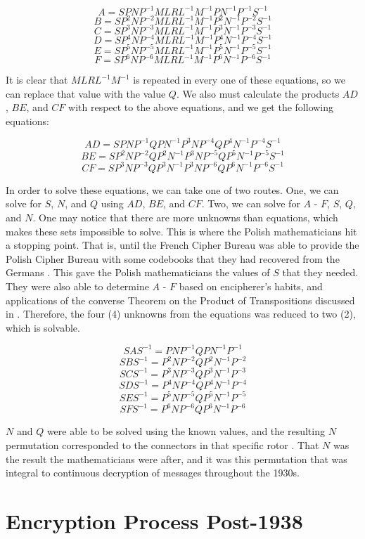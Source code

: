 $$A = SPNP^{-1}MLRL^{-1}M^{-1}PN^{-1}P^{-1}S^{-1}$$
$$B = SP^2NP^{-2}MLRL^{-1}M^{-1}P^2N^{-1}P^{-2}S^{-1}$$
$$C = SP^3NP^{-3}MLRL^{-1}M^{-1}P^3N^{-1}P^{-3}S^{-1}$$
$$D = SP^4NP^{-4}MLRL^{-1}M^{-1}P^4N^{-1}P^{-4}S^{-1}$$
$$E = SP^5NP^{-5}MLRL^{-1}M^{-1}P^5N^{-1}P^{-5}S^{-1}$$
$$F = SP^6NP^{-6}MLRL^{-1}M^{-1}P^6N^{-1}P^{-6}S^{-1}$$

It is clear that $MLRL^{-1}M^{-1}$ is repeated in every one of these equations, so we can replace that value with the value $Q$. \cite{wk85} We also must calculate the products $AD$, $BE$, and $CF$ with respect to the above equations, and we get the following equations:

$$AD = SPNP^{-1}QPN^{-1}P^3NP^{-4}QP^4N^{-1}P^{-4}S^{-1}$$
$$BE = SP^2NP^{-2}QP^2N^{-1}P^3NP^{-5}QP^5N^{-1}P^{-5}S^{-1}$$
$$CF = SP^3NP^{-3}QP^3N^{-1}P^3NP^{-6}QP^6N^{-1}P^{-6}S^{-1}$$

In order to solve these equations, we can take one of two routes. One, we can solve for $S$, $N$, and $Q$ using $AD$, $BE$, and $CF$. Two, we can solve for $A$ - $F$, $S$, $Q$, and $N$. One may notice that there are more unknowns than equations, which makes these sets impossible to solve. This is where the Polish mathematicians hit a stopping point. That is, until the French Cipher Bureau was able to provide the Polish Cipher Bureau with some codebooks that they had recovered from the Germans \cite{wk85}. This gave the Polish mathematicians the values of $S$ that they needed. They were also able to determine $A$ - $F$ based on encipherer's habits, and applications of the converse Theorem on the Product of Transpositions discussed in . Therefore, the four (4) unknowns from the equations was reduced to two (2), which is solvable.

$$SAS^{-1} = PNP^{-1}QPN^{-1}P^{-1}$$
$$SBS^{-1} = P^2NP^{-2}QP^2N^{-1}P^{-2}$$
$$SCS^{-1} = P^3NP^{-3}QP^3N^{-1}P^{-3}$$
$$SDS^{-1} = P^4NP^{-4}QP^4N^{-1}P^{-4}$$
$$SES^{-1} = P^5NP^{-5}QP^5N^{-1}P^{-5}$$
$$SFS^{-1} = P^6NP^{-6}QP^6N^{-1}P^{-6}$$

$N$ and $Q$ were able to be solved using the known values, and the resulting $N$ permutation corresponded to the connectors in that specific rotor \cite{wk85}. That $N$ was the result the mathematicians were after, and it was this permutation that was integral to continuous decryption of messages throughout the 1930s.

\section{Encryption Process Post-1938}

